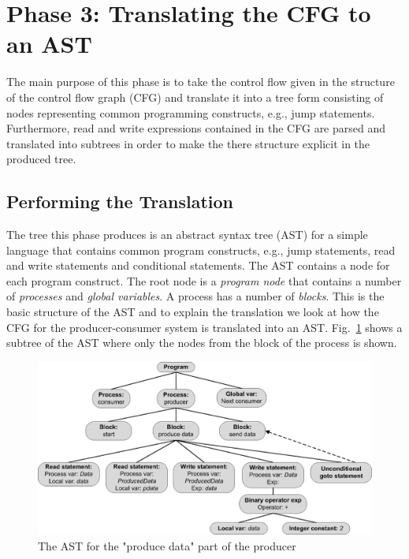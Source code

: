 \section{Phase 3: Translating the CFG to an AST}
\label{sec:cfgtoast}
The main purpose of this phase is to take the control flow given in the structure of the control flow graph (CFG) and translate it into a tree form consisting of nodes representing common programming constructs, e.g., jump statements. Furthermore, read and write expressions contained in the CFG are parsed and translated into subtrees in order to make the there structure explicit in the produced tree.

\subsection{Performing the Translation}
The tree this phase produces is an abstract syntax tree (AST) for a simple language that contains common program constructs, e.g., jump statements, read and write statements and conditional statements. The AST contains a node for each program construct. The root node is a \emph{program node} that contains a number of \emph{processes} and \emph{global variables}. A process has a number of \emph{blocks}. This is the basic structure of the AST and to explain the translation we look at how the CFG for the producer-consumer system is translated into an AST. Fig.~\ref{fig:producerast} shows a subtree of the AST where only the nodes from the  block of the  process is shown.

\begin{figure}
\centering
\includegraphics[width=\textwidth]{translation/cfg_to_ast/graphics/producerast.eps}
\caption{The AST for the "produce data" part of the producer}
\label{fig:producerast}
\end{figure}

